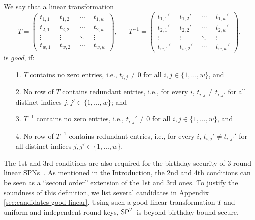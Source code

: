 \begin{definition}
	\label{defn:good-T}
	
	We say that a linear transformation
	\[
	T=
	\left(
	\begin{array}{cccc}
	t_{1,1}~ & ~t_{1,2}~ & ~\cdots~ & ~t_{1,w}  \\
	t_{2,1}~ & ~t_{2,2}~ & ~\cdots~ & ~t_{2,w}  \\
	\vdots~   & ~\vdots~  &~\ddots~ & ~\vdots   \\
	t_{w,1}~ & ~t_{w,2}~ & ~\cdots~ & ~t_{w,w}  
	\end{array}
	\right),\ \ \ \ \ \ \ 
	T^{-1}=
	\left(
	\begin{array}{cccc}
	t_{1,1}'~ & ~t_{1,2}'~ & ~\cdots~ & ~t_{1,w}'  \\
	t_{2,1}'~ & ~t_{2,2}'~ & ~\cdots~ & ~t_{2,w}'  \\
	\vdots~   & ~\vdots~  &~\ddots~ & ~\vdots   \\
	t_{w,1}'~ & ~t_{w,2}'~ & ~\cdots~ & ~t_{w,w}'  
	\end{array}
	\right),
	\]
	is {\it good}, if:
	\begin{enumerate}
		\item[1.] $T$ contains no zero entries, i.e., $t_{i,j}\neq 0$ for all $i,j\in\{1,\ldots,w\}$, and
		\item[2.] No row of $T$ contains redundant entries, i.e., for every $i$, $t_{i,j}\neq t_{i,j'}$ for all distinct indices $j,j'\in\{1,\ldots,w\}$; and
		\item[3.] $T^{-1}$ contains no zero entries, i.e., $t_{i,j}'\neq 0$ for all $i,j\in\{1,\ldots,w\}$, and
		\item[4.] No row of $T^{-1}$ contains redundant entries, i.e., for every $i$, $t_{i,j}'\neq t_{i,j'}'$ for all distinct indices $j,j'\in\{1,\ldots,w\}$.
	\end{enumerate}
\end{definition}
%
The 1st and 3rd conditions are also required for the birthday security of 3-round linear SPNs~\cite[Sect. 3]{EPRINT:DKSTZ17}. As mentioned in the Introduction, the 2nd and 4th conditions can be seen as a ``second order'' extension of the 1st and 3rd ones. To justify the soundness of this definition, we list several candidates in Appendix \ref{sec:candidates-good-linear}. Using such a good linear transformation $T$ and uniform and independent round keys, $\mathsf{SP}^T$ is beyond-birthday-bound secure.


